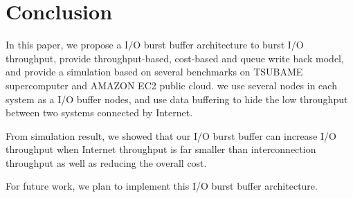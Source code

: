 \section{Conclusion}
\label{sec:conclusion}

In this paper, we propose a I/O burst buffer architecture to burst I/O throughput, provide throughput-based, cost-based and queue write back model, and provide a simulation based on several benchmarks on TSUBAME supercomputer and AMAZON EC2 public cloud.
we use several nodes in each system as a I/O buffer nodes, and use data buffering to hide the low throughput between two systems connected by Internet.

From simulation result, we showed that our I/O burst buffer can increase I/O throughput when Internet throughput is far smaller than interconnection throughput as well as reducing the overall cost.

For future work, we plan to implement this I/O burst buffer architecture.
